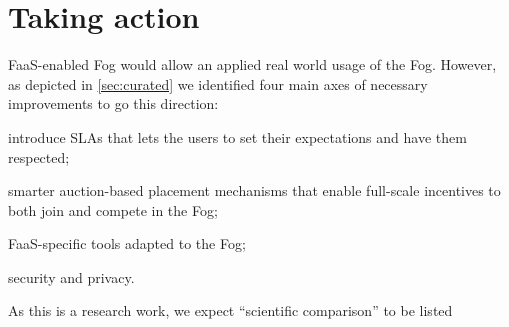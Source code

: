 \section{Taking action}
\label{sec:takingaction}

\gls{FaaS}-enabled Fog would allow an applied real world usage of the Fog. However, as depicted in \ref{sec:curated} we identified four main axes of necessary improvements to go this direction:
\begin{enumerate*}[(i)]
	\item introduce \glspl{SLA} that lets the users to set their expectations and have them respected;
	\item smarter auction-based placement mechanisms that enable full-scale incentives to both join and compete in the Fog;
	\item \gls{FaaS}-specific tools adapted to the Fog;
	\item security and privacy.
\end{enumerate*}
As this is a research work, we expect “scientific comparison” to be listed

